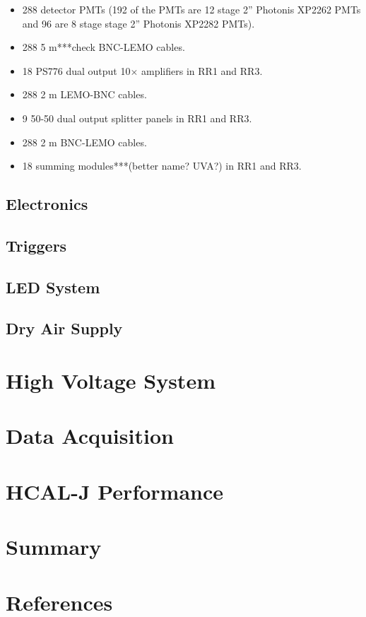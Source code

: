 \documentclass[review]{elsarticle}
\newcommand{\hcal}{HCAL-J }
\begin{document}
\begin{itemize}\itemsep6pt \parskip0pt 
	\item 288 detector PMTs (192 of the PMTs are 12 stage 2'' Photonis XP2262 PMTs and 96 are 8 stage stage 2'' Photonis XP2282 PMTs).
	\item 288 5 m***check BNC-LEMO cables. 
	\item 18 PS776 dual output 10$\times$ amplifiers in RR1 and RR3.
	\item 288 2 m LEMO-BNC cables. 
	\item 9 50-50 dual output splitter panels in RR1 and RR3. 
	\item 288 2 m BNC-LEMO cables.
	\item 18 summing modules***(better name? UVA?) in RR1 and RR3.
\end{itemize}

\subsection{Electronics}
\label{electronics}

\subsection{Triggers}
\label{triggers}

\subsection{LED System}
\label{leds}

\subsection{Dry Air Supply}
\label{dry_air}

\section{High Voltage System}
\label{hv}

\section{Data Acquisition}
\label{daq}

\section{\hcal Performance}
\label{results}

\section{Summary}
\label{summary}

\section*{References}
\label{refs}


\end{document}
